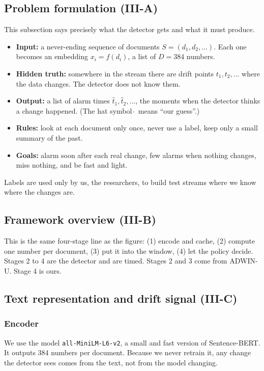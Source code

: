 \documentclass[11pt,a4paper]{article}
\begin{document}
\subsection{Problem formulation (III-A)}

This subsection says precisely what the detector gets and what it must produce.
\begin{itemize}
\item \textbf{Input:} a never-ending sequence of documents $S=(d_1,d_2,\dots)$. Each one becomes an embedding $x_i=f(d_i)$, a list of $D=384$ numbers.
\item \textbf{Hidden truth:} somewhere in the stream there are drift points $t_1, t_2, \dots$ where the data changes. The detector does not know them.
\item \textbf{Output:} a list of alarm times $\hat t_1, \hat t_2, \dots$, the moments when the detector thinks a change happened. (The hat symbol $\hat{\ }$ means ``our guess''.)
\item \textbf{Rules:} look at each document only once, never use a label, keep only a small summary of the past.
\item \textbf{Goals:} alarm soon after each real change, few alarms when nothing changes, miss nothing, and be fast and light.
\end{itemize}
Labels are used only by us, the researchers, to build test streams where we know where the changes are.

\subsection{Framework overview (III-B)}

This is the same four-stage line as the figure: (1) encode and cache, (2) compute one number per document, (3) put it into the window, (4) let the policy decide. Stages 2 to 4 are the detector and are timed. Stages 2 and 3 come from ADWIN-U. Stage 4 is ours.

\subsection{Text representation and drift signal (III-C)}

\subsubsection*{Encoder}
We use the model \texttt{all-MiniLM-L6-v2}, a small and fast version of Sentence-BERT. It outputs 384 numbers per document. Because we never retrain it, any change the detector sees comes from the text, not from the model changing.
\end{document}
